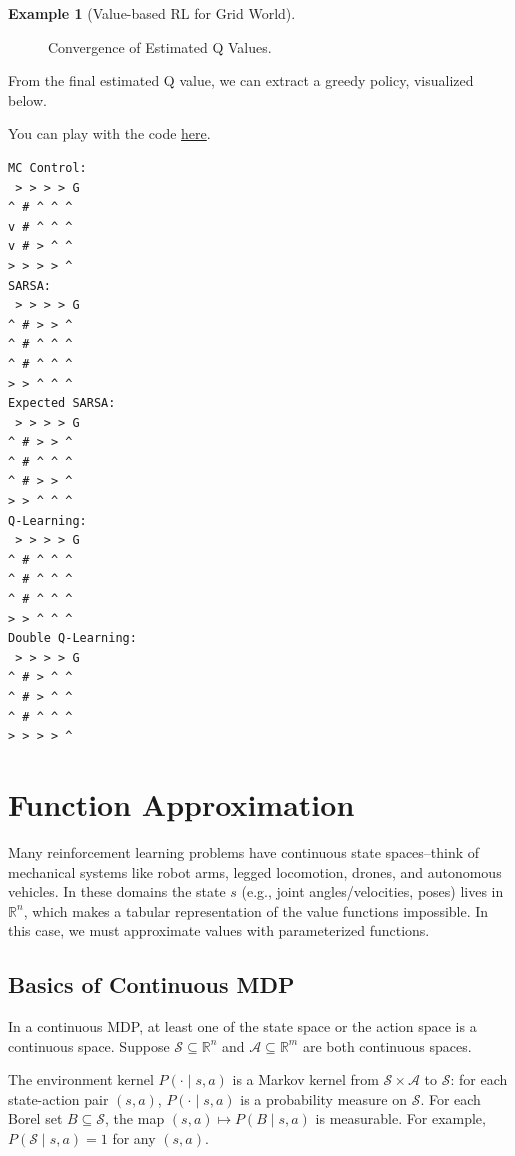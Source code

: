 \documentclass[
]{book}
\theoremstyle{definition}
\theoremstyle{definition}
\newtheorem{example}{Example}[chapter]
\theoremstyle{definition}
\theoremstyle{definition}
\theoremstyle{remark}
\begin{document}
\begin{example}[Value-based RL for Grid World]
\begin{figure}
{}

\caption{Convergence of Estimated Q Values.}\label{fig:grid-world-Q-convergence}
\end{figure}

From the final estimated Q value, we can extract a greedy policy, visualized below.

You can play with the code \href{https://github.com/ComputationalRobotics/2025-ES-AM-158-LECTURE-CODE/blob/main/GPI_GridWorld.py}{here}.

\begin{verbatim}
MC Control:
 > > > > G
^ # ^ ^ ^
v # ^ ^ ^
v # > ^ ^
> > > > ^
SARSA:
 > > > > G
^ # > > ^
^ # ^ ^ ^
^ # ^ ^ ^
> > ^ ^ ^
Expected SARSA:
 > > > > G
^ # > > ^
^ # ^ ^ ^
^ # > > ^
> > ^ ^ ^
Q-Learning:
 > > > > G
^ # ^ ^ ^
^ # ^ ^ ^
^ # ^ ^ ^
> > ^ ^ ^
Double Q-Learning:
 > > > > G
^ # > ^ ^
^ # > ^ ^
^ # ^ ^ ^
> > > > ^
\end{verbatim}

\end{example}

\section{Function Approximation}\label{function-approximation}

Many reinforcement learning problems have continuous state spaces--think of mechanical systems like robot arms, legged locomotion, drones, and autonomous vehicles. In these domains the state \(s\) (e.g., joint angles/velocities, poses) lives in \(\mathbb{R}^n\), which makes a tabular representation of the value functions impossible. In this case, we must approximate values with parameterized functions.

\subsection{Basics of Continuous MDP}\label{basics-of-continuous-mdp}

In a continuous MDP, at least one of the state space or the action space is a continuous space. Suppose \(\mathcal{S} \subseteq \mathbb{R}^n\) and \(\mathcal{A} \subseteq \mathbb{R}^{m}\) are both continuous spaces.

The environment kernel \(P(\cdot \mid s, a)\) is a Markov kernel from \(\mathcal{S} \times \mathcal{A}\) to \(\mathcal{S}\): for each state-action pair \((s,a)\), \(P(\cdot \mid s,a)\) is a probability measure on \(\mathcal{S}\). For each Borel set \(B \subseteq \mathcal{S}\), the map \((s,a) \mapsto P(B \mid s, a)\) is measurable. For example, \(P(\mathcal{S} \mid s, a) = 1\) for any \((s,a)\).
\end{document}
